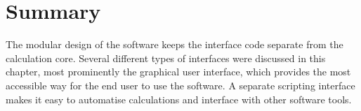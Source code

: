 \section{Summary}
The modular design of the software keeps the interface code separate from the calculation core.
Several different types of interfaces were discussed in this chapter, most prominently the graphical 
user interface, which provides the most accessible way for the end user to use the software.
A separate scripting interface makes it easy to automatise calculations and interface with other
software tools.

